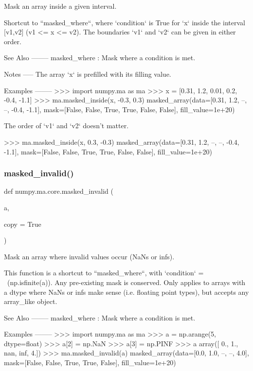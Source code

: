 \begin{DoxyVerb}Mask an array inside a given interval.

Shortcut to ``masked_where``, where `condition` is True for `x` inside
the interval [v1,v2] (v1 <= x <= v2).  The boundaries `v1` and `v2`
can be given in either order.

See Also
--------
masked_where : Mask where a condition is met.

Notes
-----
The array `x` is prefilled with its filling value.

Examples
--------
>>> import numpy.ma as ma
>>> x = [0.31, 1.2, 0.01, 0.2, -0.4, -1.1]
>>> ma.masked_inside(x, -0.3, 0.3)
masked_array(data=[0.31, 1.2, --, --, -0.4, -1.1],
             mask=[False, False,  True,  True, False, False],
       fill_value=1e+20)

The order of `v1` and `v2` doesn't matter.

>>> ma.masked_inside(x, 0.3, -0.3)
masked_array(data=[0.31, 1.2, --, --, -0.4, -1.1],
             mask=[False, False,  True,  True, False, False],
       fill_value=1e+20)\end{DoxyVerb}
 \mbox{\label{namespacenumpy_1_1ma_1_1core_a7195e11522e90711c9f3a792ab8786cc}} 
\subsubsection{\texorpdfstring{masked\+\_\+invalid()}{masked\_invalid()}}
{\footnotesize\ttfamily def numpy.\+ma.\+core.\+masked\+\_\+invalid (\begin{DoxyParamCaption}\item[{}]{a,  }\item[{}]{copy = {\ttfamily True} }\end{DoxyParamCaption})}

\begin{DoxyVerb}Mask an array where invalid values occur (NaNs or infs).

This function is a shortcut to ``masked_where``, with
`condition` = ~(np.isfinite(a)). Any pre-existing mask is conserved.
Only applies to arrays with a dtype where NaNs or infs make sense
(i.e. floating point types), but accepts any array_like object.

See Also
--------
masked_where : Mask where a condition is met.

Examples
--------
>>> import numpy.ma as ma
>>> a = np.arange(5, dtype=float)
>>> a[2] = np.NaN
>>> a[3] = np.PINF
>>> a
array([ 0.,  1., nan, inf,  4.])
>>> ma.masked_invalid(a)
masked_array(data=[0.0, 1.0, --, --, 4.0],
             mask=[False, False,  True,  True, False],
       fill_value=1e+20)\end{DoxyVerb}
 \mbox{\label{namespacenumpy_1_1ma_1_1core_adf8c1570bc23816eafa836c71bef39af}} 
